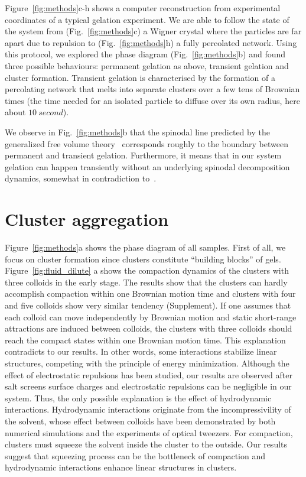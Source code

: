 Figure~\ref{fig:methods}c-h shows a computer reconstruction from experimental coordinates of a typical gelation experiment. We are able to follow the state of the system from (Fig.~\ref{fig:methods}c) a Wigner crystal where the particles are far apart due to repulsion to (Fig.~\ref{fig:methods}h) a fully percolated network. Using this protocol, we explored the phase diagram (Fig.~\ref{fig:methods}b) and found three possible behaviours: permanent gelation as above, transient gelation and cluster formation. Transient gelation is characterised by the formation of a percolating network that melts into separate clusters over a few tens of Brownian times (the time needed for an isolated particle to diffuse over its own radius, here about $\SI{10}{second}$).

We observe in Fig.~\ref{fig:methods}b that the spinodal line predicted by the generalized free volume theory~\cite{Fleer2008} corresponds roughly to the boundary between permanent and transient gelation. Furthermore, it means that in our system gelation can happen transiently without an underlying spinodal decomposition dynamics, somewhat in contradiction to~\cite{lu2008gelation}.





\section{Cluster aggregation} %
Figure~\ref{fig:methods}a shows the phase diagram of all samples.
First of all, we focus on cluster formation since clusters constitute ``building blocks'' of gels.
Figure~\ref{fig:fluid_dilute} a shows the compaction dynamics of the clusters with three colloids in the early stage.
The results show that the clusters can hardly accomplish compaction within one Brownian motion time and clusters with four and five colloids show very similar tendency (Supplement).
If one assumes that each colloid can move independently by Brownian motion and static short-range attractions are induced between colloids, the clusters with three colloids should reach the compact states within one Brownian motion time.
This explanation contradicts to our results.
In other words, some interactions stabilize linear structures, competing with the principle of energy minimization.
Although the effect of electrostatic repulsions has been studied, our results are observed after salt screens surface charges and electrostatic repulsions can be negligible in our system.
Thus, the only possible explanation is the effect of hydrodynamic interactions.
Hydrodynamic interactions originate from the incompressivility of the solvent, whose effect between colloids have been demonstrated by both numerical simulations and the experiments of optical tweezers.
For compaction, clusters must squeeze the solvent inside the cluster to the outside.
Our results suggest that squeezing process can be the bottleneck of compaction and hydrodynamic interactions enhance linear structures in clusters.




